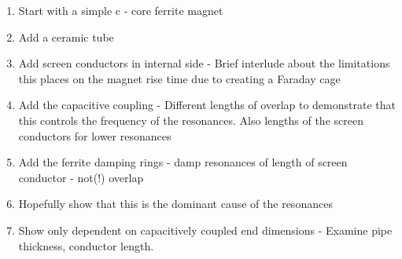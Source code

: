 \begin{enumerate}
\item{Start with a simple c - core ferrite magnet}
\item{Add a ceramic tube}
\item{Add screen conductors in internal side - Brief interlude about the limitations this places on the magnet rise time due to creating a Faraday cage}
\item{Add the capacitive coupling - Different lengths of overlap to demonstrate that this controls the frequency of the resonances. Also lengths of the screen conductors for lower resonances}
\item{Add the ferrite damping rings - damp resonances of length of screen conductor - not(!) overlap}
\item{Hopefully show that this is the dominant cause of the resonances}
\item{Show only dependent on capacitively coupled end dimensions - Examine pipe thickness, conductor length.}
\end{enumerate}
